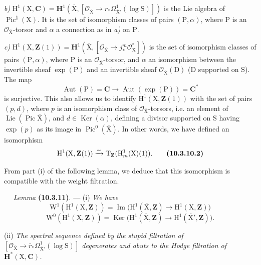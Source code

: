 \documentclass[11pt,leqno]{article}
\newcommand{\Page}[1]{\ifvmode\noindent\else\unskip\ \fi{\footnotesize\textcolor{gray}{[p.\,#1]}}\ \ignorespaces}
\begin{document}
\textit{b)} \(\mathrm{H}^{1}(\mathrm{X},\mathbf{C})=\mathbf{H}^{1}(\overline{\mathrm{X}},[\mathcal{O}_{\overline{\mathrm{X}}}\to r_*\Omega^{1}_{\overline{\mathrm{X}}'}(\log\mathrm{S})])\) is the Lie algebra of \(\operatorname{Pic}^{\natural}(\mathrm{X})\). It is the set of isomorphism classes of pairs \((\mathrm{P},\alpha)\), where \(\mathrm{P}\) is an \(\mathcal{O}_{\overline{\mathrm{X}}}\)-torsor and \(\alpha\) a connection as in \textit{a)} on \(\mathrm{P}\).

\textit{c)} \(\mathrm{H}^{1}(\mathrm{X},\mathbf{Z}(1))=\mathbf{H}^{1}(\overline{\mathrm{X}},[\mathcal{O}_{\overline{\mathrm{X}}}\to j_*^{m}\mathcal{O}_{\mathrm{X}}^{*}])\) is the set of isomorphism classes of pairs \((\mathrm{P},\alpha)\), where \(\mathrm{P}\) is an \(\mathcal{O}_{\overline{\mathrm{X}}}\)-torsor, and \(\alpha\) an isomorphism between the invertible sheaf \(\exp(\mathrm{P})\) and an invertible sheaf  \(\mathcal{O}_{\overline{\mathrm{X}}}(\mathrm{D})\) (\(\mathrm{D}\) supported on \(\mathrm{S}\)). The map
\[
\operatorname{Aut}(\mathrm{P})=\mathbf{C}
\longrightarrow\operatorname{Aut}(\exp(\mathrm{P}))=\mathbf{C}^{*}
\]
is surjective. This also allows us to identify \(\mathrm{H}^{1}(\mathrm{X},\mathbf{Z}(1))\) with the set of pairs \((p,d)\), where \(p\) is an isomorphism class of \(\mathcal{O}_{\overline{\mathrm{X}}}\)-torsors, i.e. an element of \(\operatorname{Lie}(\operatorname{Pic}\overline{\mathrm{X}})\), and \(d\in\operatorname{Ker}(\alpha)\), defining a divisor supported on \(\mathrm{S}\) having \(\exp(p)\) as its image in \(\operatorname{Pic}^{0}(\overline{\mathrm{X}})\). In other words, we have defined an isomorphism
\[
\mathrm{H}^{1}(\mathrm{X},\mathbf{Z}(1))
\xrightarrow{\sim}
\mathrm{T}_{\mathbf{Z}}(\mathrm{H}^{1}_{m}(\mathrm{X})(1)).
\tag*{\textbf{(10.3.10.2)}}
\]

From part (i) of the following lemma, we deduce that this isomorphism is compatible with the weight filtration.

\Page{73}
\textit{Lemma} \textbf{(10.3.11)}. — (i) \textit{We have}
\[
\mathrm{W}^{1}(\mathrm{H}^{1}(\mathrm{X},\mathbf{Z}))
=\operatorname{Im}\bigl(
\mathrm{H}^{1}(\overline{\mathrm{X}},\mathbf{Z})
\to\mathrm{H}^{1}(\mathrm{X},\mathbf{Z})\bigr)
\]
\[
\mathrm{W}^{0}(\mathrm{H}^{1}(\mathrm{X},\mathbf{Z}))
=\operatorname{Ker}\bigl(
\mathrm{H}^{1}(\overline{\mathrm{X}},\mathbf{Z})
\to\mathrm{H}^{1}(\overline{\mathrm{X}}',\mathbf{Z})\bigr).
\]

(ii) \textit{The spectral sequence defined by the stupid filtration of
\([\mathcal{O}_{\overline{\mathrm{X}}}\to
\bar r_*\Omega^{1}_{\overline{\mathrm{X}}'}(\log\mathrm{S})]\)
degenerates and abuts to the Hodge filtration of
\(\mathbf{H}^{*}(\mathrm{X},\mathbf{C})\).}
\end{document}
